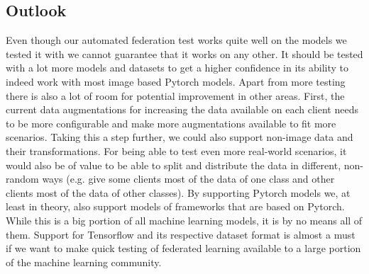 \subsection{Outlook}
Even though our automated federation test works quite well on the models we tested it with we cannot guarantee that it works on any other. It should be tested with a lot more models and datasets to get a higher confidence in its ability to indeed work with most image based Pytorch models.  
Apart from more testing there is also a lot of room for potential improvement in other areas. First, the current data augmentations for increasing the data available on each client needs to be more configurable and make more augmentations available to fit more scenarios. Taking this a step further, we could also support non-image data and their transformations. For being able to test even more real-world scenarios, it would also be of value to be able to split and distribute the data in different, non-random ways (e.g. give some clients most of the data of one class and other clients most of the data of other classes).
By supporting Pytorch models we, at least in theory, also support models of frameworks that are based on Pytorch. While this is a big portion of all machine learning models, it is by no means all of them. Support for Tensorflow and its respective dataset format is almost a must if we want to make quick testing of federated learning available to a large portion of the machine learning community.
